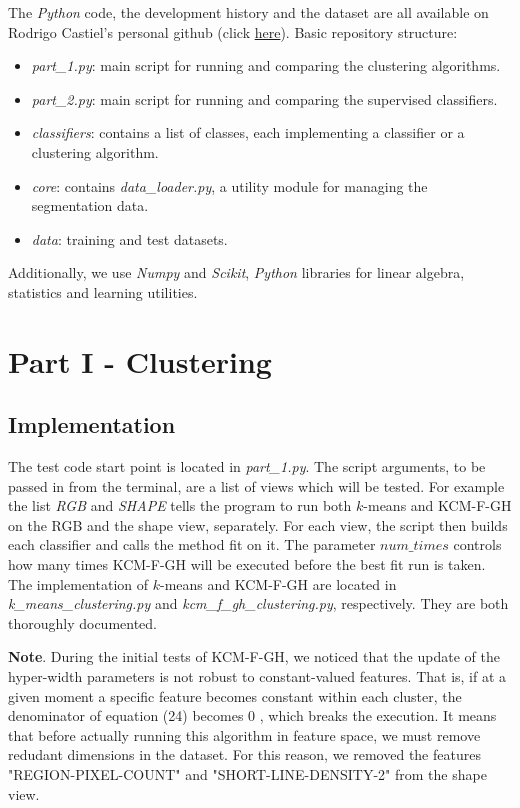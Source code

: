 \documentclass[conference]{IEEEtran}
\begin{document}
The \textit{Python} code, the development history and the dataset are all available on Rodrigo Castiel's personal github (click \href{https://github.com/RodrigoCastiel/am_f}{here}).
Basic repository structure:
\begin{itemize}
\item \textit{part\_1.py}: main script for running and comparing the clustering algorithms.
\item \textit{part\_2.py}: main script for running and comparing the supervised classifiers.
\item \textit{classifiers}: contains a list of classes, each implementing a classifier or a clustering algorithm.
\item \textit{core}: contains \textit{data\_loader.py}, a utility module for managing the segmentation data.
\item \textit{data}: training and test datasets.
\end{itemize}

Additionally, we use \textit{Numpy} and \textit{Scikit}, \textit{Python} libraries for linear algebra, statistics and learning utilities.

\section{Part I - Clustering}

\subsection{Implementation}

The test code start point is located in \textit{part\_1.py}.
The script arguments, to be passed in from the terminal, are a list of views which will be tested.
For example the list \textit{RGB} and \textit{SHAPE} tells the program to run both $k$-means and KCM-F-GH on the RGB and the shape view, separately.
For each view, the script then builds each classifier and calls the method fit on it.
The parameter $num\_times$ controls how many times KCM-F-GH will be executed before the best fit run is taken.
The implementation of $k$-means and KCM-F-GH are located in \textit{k\_means\_clustering.py} and \textit{kcm\_f\_gh\_clustering.py}, respectively.
They are both thoroughly documented.

\textbf{Note}. During the initial tests of KCM-F-GH, we noticed that the update of the hyper-width parameters is not robust to constant-valued features.
That is, if at a given moment a specific feature becomes constant within each cluster, the denominator of equation (24) becomes $0$ \cite{??}, which breaks the execution.
It means that before actually running this algorithm in feature space, we must remove redudant dimensions in the dataset.
For this reason, we removed the features "REGION-PIXEL-COUNT" and "SHORT-LINE-DENSITY-2" from the shape view.
\end{document}
